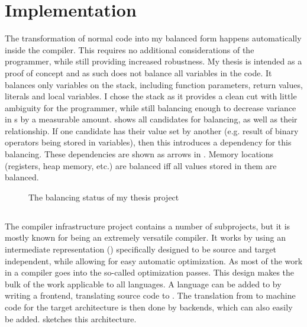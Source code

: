 \chapter{Implementation}
\label{pass}
The transformation of normal code into my balanced form happens automatically inside the compiler.
This requires no additional considerations of the programmer, while still providing increased robustness.
My thesis is intended as a proof of concept and as such does not balance all variables in the code.
It balances only variables on the stack, including function parameters, return values, literals and local variables.
I chose the stack as it provides a clean cut with little ambiguity for the programmer, while still balancing enough to decrease variance in \hammingw{}s by a measurable amount.
 shows all candidates for balancing, as well as their relationship.
If one candidate has their value set by another (e.g. result of binary operators being stored in variables), then this introduces a dependency for this balancing.
These dependencies are shown as arrows in .
Memory locations (registers, heap memory, etc.) are balanced iff all values stored in them are balanced.

\begin{figure}[h]
  \centering
  \caption{The balancing status of my thesis project}
  \label{fig:implementation}
\end{figure}

\section{\llvm{}}
\label{llvm}
The \llvm{} compiler infrastructure project\cite{lattner2010llvm} contains a number of subprojects, but it is mostly known for being an extremely versatile compiler.
It works by using an intermediate representation (\ir{}) specifically designed to be source and target independent, while allowing for easy automatic optimization.
As most of the work in a compiler goes into the so-called optimization passes.
This design makes the bulk of the work applicable to all languages.
A language can be added to \llvm{} by writing a frontend, translating source code to \ir{}.
The translation from \ir{} to machine code for the target architecture is then done by backends, which can also easily be added.
 sketches this architecture.

